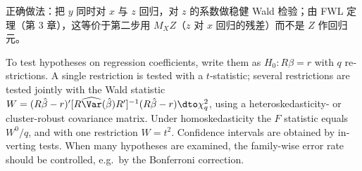 \begin{prac}
正确做法：把 $y$ 同时对 $x$ 与 $z$ 回归，对 $z$ 的系数做稳健 Wald 检验；由 FWL 定理（第 3 章），这等价于第二步用 $M_XZ$（$z$ 对 $x$ 回归的残差）而不是 $Z$ 作回归元。
\end{prac}

\begin{english}
To test hypotheses on regression coefficients, write them as $H_0:R\beta=r$ with $q$ restrictions. A single restriction is tested with a $t$-statistic; several restrictions are tested jointly with the Wald statistic $W=(R\hat\beta-r)'[R\widehat{\Var}(\hat\beta)R']^{-1}(R\hat\beta-r)\dto\chi^2_q$, using a heteroskedasticity- or cluster-robust covariance matrix. Under homoskedasticity the $F$ statistic equals $W^0/q$, and with one restriction $W=t^2$. Confidence intervals are obtained by inverting tests. When many hypotheses are examined, the family-wise error rate should be controlled, e.g.\ by the Bonferroni correction.
\end{english}
